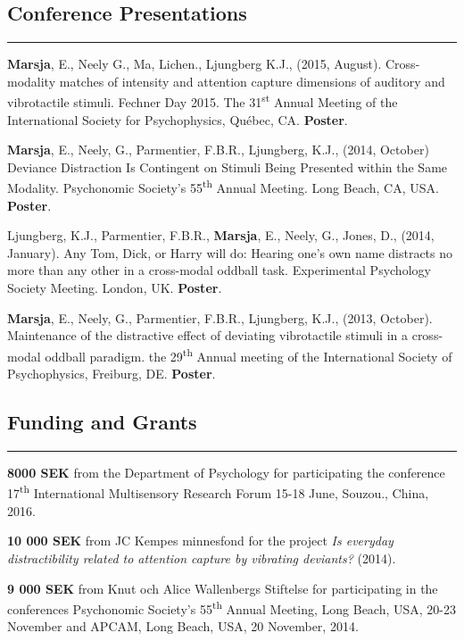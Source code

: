 \documentclass[]{article}
\begin{document}
\subsection{Conference Presentations}\label{conference-presentations}

\hrule

\textbf{Marsja}, E., Neely G., Ma, Lichen., Ljungberg K.J., (2015,
August). Cross-modality matches of intensity and attention capture
dimensions of auditory and vibrotactile stimuli. Fechner Day 2015. The
31\textsuperscript{st} Annual Meeting of the International Society for
Psychophysics, Québec, CA. \textbf{Poster}.

\textbf{Marsja}, E., Neely, G., Parmentier, F.B.R., Ljungberg, K.J.,
(2014, October) Deviance Distraction Is Contingent on Stimuli Being
Presented within the Same Modality. Psychonomic Society's
55\textsuperscript{th} Annual Meeting. Long Beach, CA, USA.
\textbf{Poster}.

Ljungberg, K.J., Parmentier, F.B.R., \textbf{Marsja}, E., Neely, G.,
Jones, D., (2014, January). Any Tom, Dick, or Harry will do: Hearing
one's own name distracts no more than any other in a cross-modal oddball
task. Experimental Psychology Society Meeting. London, UK.
\textbf{Poster}.

\textbf{Marsja}, E., Neely, G., Parmentier, F.B.R., Ljungberg, K.J.,
(2013, October). Maintenance of the distractive effect of deviating
vibrotactile stimuli in a cross-modal oddball paradigm. the
29\textsuperscript{th} Annual meeting of the International Society of
Psychophysics, Freiburg, DE. \textbf{Poster}.

\subsection{Funding and Grants}\label{funding-and-grants}

\hrule

\textbf{8000 SEK} from the Department of Psychology for participating
the conference 17\textsuperscript{th} International Multisensory
Research Forum 15-18 June, Souzou., China, 2016.

\textbf{10 000 SEK} from JC Kempes minnesfond for the project \emph{Is
everyday distractibility related to attention capture by vibrating
deviants?} (2014).

\textbf{9 000 SEK} from Knut och Alice Wallenbergs Stiftelse for
participating in the conferences Psychonomic Society's
55\textsuperscript{th} Annual Meeting, Long Beach, USA, 20-23 November
and APCAM, Long Beach, USA, 20 November, 2014.
\end{document}
